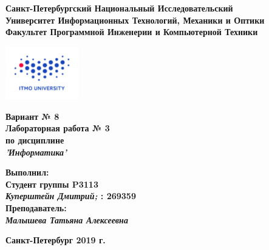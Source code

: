 \documentclass[11pt]{article}
\author{АВТОР}
\date{\today}
\title{}
\begin{document}
\newcommand\pythonstyle{\lstset{
language=Python,
basicstyle=\ttm,
otherkeywords={self},             %
keywordstyle=\ttb\color{deepblue},
emph={MyClass,__init__},          %
emphstyle=\ttb\color{deepred},    %
stringstyle=\color{deepgreen},
frame=tb,                         %
showstringspaces=false            %
}}
\newcommand\pythonexternal[2][]{{
\pythonstyle
}}
\large
\thispagestyle{empty}
\begin{center}
\textbf{Санкт-Петербургский Национальный Исследовательский}\\
\textbf{Университет Информационных Технологий, Механики и Оптики}\\
\textbf{Факультет Программной Инженерии и Компьютерной Техники}\\
\end{center}
\vspace{1em}
\begin{center}
\includegraphics[width=120px]{../../../itmo-logo.png}
\end{center}
\LARGE
\vspace{5em}
\begin{center}
\textbf{Вариант № 8}\\
\textbf{Лабораторная работа № 3}\\
\Large
\textbf{по дисциплине}\\
\LARGE
\textbf{\emph{'Информатика'}}\\
\end{center}
\vspace{11em}
\large
\begin{flushright}
\textbf{Выполнил:}\\
\textbf{Студент группы P3113}\\
\textbf{\emph{Куперштейн Дмитрий;} : 269359}\\
\textbf{Преподаватель:}\\
\textbf{\emph{Малышева Татьяна Алексеевна}}\\
\end{flushright}
\vspace{4em}
\large
\begin{center}
\textbf{Санкт-Петербург 2019 г.}
\end{center}
\pagebreak{}
\setcounter{tocdepth}{2}
\tableofcontents
\vspace{2em}
\pagebreak{}
\end{document}
